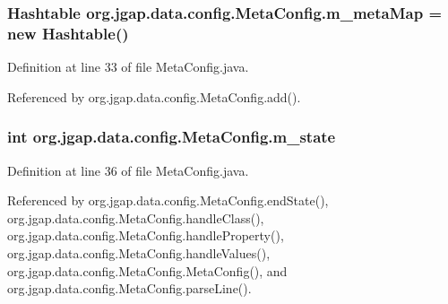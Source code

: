 \hypertarget{classorg_1_1jgap_1_1data_1_1config_1_1_meta_config_a692ba697bf86f532083730ea8d3ff91b}{
\subsubsection[{m\-\_\-meta\-Map}]{\setlength{\rightskip}{0pt plus 5cm}Hashtable org.\-jgap.\-data.\-config.\-Meta\-Config.\-m\-\_\-meta\-Map = new Hashtable()\hspace{0.3cm}{\ttfamily [private]}}}\label{classorg_1_1jgap_1_1data_1_1config_1_1_meta_config_a692ba697bf86f532083730ea8d3ff91b}


Definition at line 33 of file Meta\-Config.\-java.



Referenced by org.\-jgap.\-data.\-config.\-Meta\-Config.\-add().

\hypertarget{classorg_1_1jgap_1_1data_1_1config_1_1_meta_config_a5da330e8f7e6f0e2f65032b181d18051}{
\subsubsection[{m\-\_\-state}]{\setlength{\rightskip}{0pt plus 5cm}int org.\-jgap.\-data.\-config.\-Meta\-Config.\-m\-\_\-state\hspace{0.3cm}{\ttfamily [private]}}}\label{classorg_1_1jgap_1_1data_1_1config_1_1_meta_config_a5da330e8f7e6f0e2f65032b181d18051}


Definition at line 36 of file Meta\-Config.\-java.



Referenced by org.\-jgap.\-data.\-config.\-Meta\-Config.\-end\-State(), org.\-jgap.\-data.\-config.\-Meta\-Config.\-handle\-Class(), org.\-jgap.\-data.\-config.\-Meta\-Config.\-handle\-Property(), org.\-jgap.\-data.\-config.\-Meta\-Config.\-handle\-Values(), org.\-jgap.\-data.\-config.\-Meta\-Config.\-Meta\-Config(), and org.\-jgap.\-data.\-config.\-Meta\-Config.\-parse\-Line().

